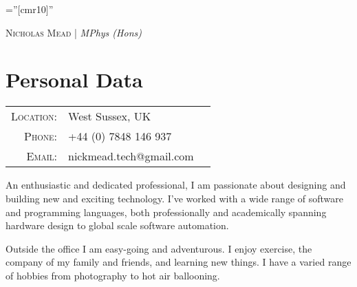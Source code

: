 \documentclass[a4paper,11pt]{article}
\begin{document}
\pagestyle{empty} %

\font\fb=''[cmr10]'' %

\par{\centering
  {\Huge\textsc{Nicholas Mead |} \textit{MPhys (Hons)}
  }\bigskip\par}

\section{Personal Data}

\begin{tabular}{rlr}
  \textsc{Location:}  & West Sussex, UK\\ 
  \textsc{Phone:}     & +44 (0) 7848 146 937\\
  \textsc{Email:}     & nickmead.tech@gmail.com
\end{tabular}

\footnotesize{
An enthusiastic and dedicated professional, I am passionate about designing and building new and exciting technology. I've worked with a wide range of software and programming languages, both professionally and academically spanning hardware design to global scale software automation.

Outside the office I am easy-going and adventurous. I enjoy exercise, the company of my family and friends, and learning new things. I have a varied range of hobbies from photography to hot air ballooning.}


\end{document}
